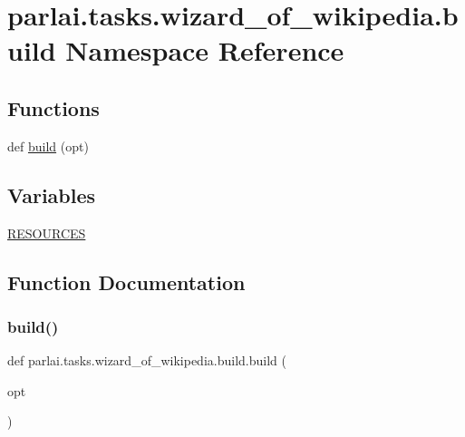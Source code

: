 \hypertarget{namespaceparlai_1_1tasks_1_1wizard__of__wikipedia_1_1build}{}\section{parlai.\+tasks.\+wizard\+\_\+of\+\_\+wikipedia.\+build Namespace Reference}
\label{namespaceparlai_1_1tasks_1_1wizard__of__wikipedia_1_1build}
\subsection*{Functions}
\begin{DoxyCompactItemize}
\item 
def \hyperlink{namespaceparlai_1_1tasks_1_1wizard__of__wikipedia_1_1build_a9675cda9046b7287141b050272699984}{build} (opt)
\end{DoxyCompactItemize}
\subsection*{Variables}
\begin{DoxyCompactItemize}
\item 
\hyperlink{namespaceparlai_1_1tasks_1_1wizard__of__wikipedia_1_1build_ad3388ca9cad3fd5e54487c840676dddf}{R\+E\+S\+O\+U\+R\+C\+ES}
\end{DoxyCompactItemize}


\subsection{Function Documentation}
\mbox{\label{namespaceparlai_1_1tasks_1_1wizard__of__wikipedia_1_1build_a9675cda9046b7287141b050272699984}} 
\subsubsection{\texorpdfstring{build()}{build()}}
{\footnotesize\ttfamily def parlai.\+tasks.\+wizard\+\_\+of\+\_\+wikipedia.\+build.\+build (\begin{DoxyParamCaption}\item[{}]{opt }\end{DoxyParamCaption})}



